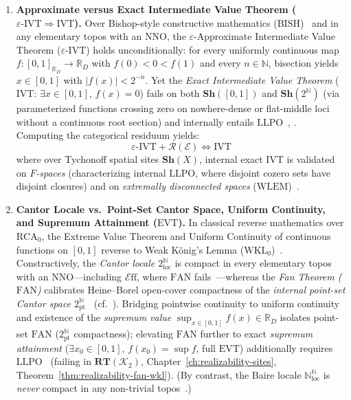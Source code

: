 \documentclass[10pt,twoside,openright]{book}
\theoremstyle{crmplain}
\theoremstyle{crmdef}
\theoremstyle{crmremark}
\newcommand{\Eff}{\mathcal{E}\mathrm{ff}}
\begin{document}
\begin{enumerate}[label=\textbf{\arabic*.},leftmargin=1.8em]
  \item \textbf{Approximate versus Exact Intermediate Value Theorem ($\varepsilon\text{-}\mathrm{IVT} \Rightarrow \mathrm{IVT}$).} Over Bishop-style constructive mathematics ($\mathrm{BISH}$)~\cite{Bishop67,Ishihara06} and in any elementary topos with an $\mathrm{NNO}$, the $\varepsilon$-Approximate Intermediate Value Theorem ($\varepsilon\text{-}\mathrm{IVT}$) holds unconditionally: for every uniformly continuous map $f: [0,1]_{\mathbb{R}_D} \to \mathbb{R}_D$ with $f(0) < 0 < f(1)$ and every $n \in \mathbb{N}$, bisection yields $x \in [0,1]$ with $|f(x)| < 2^{-n}$. Yet the \emph{Exact Intermediate Value Theorem} ($\mathrm{IVT}$: $\exists x \in [0,1],\, f(x) = 0$) fails on both $\mathbf{Sh}([0, 1])$ and $\mathbf{Sh}(2^{\mathbb{N}})$ (via parameterized functions crossing zero on nowhere-dense or flat-middle loci without a continuous root section) and internally entails $\mathrm{LLPO}$~\cite[Ch.~3]{BridgesRichman87}, \cite[\S D4.7]{Johnstone02}. Computing the categorical residuum yields:
\[
  \varepsilon\text{-}\mathrm{IVT} + \mathcal{R}(\mathcal{E}) \iff \mathrm{IVT}
\]
where over Tychonoff spatial sites $\mathbf{Sh}(X)$, internal exact $\mathrm{IVT}$ is validated on \emph{$F$-spaces} (characterizing internal $\mathrm{LLPO}$, where disjoint cozero sets have disjoint closures) and on \emph{extremally disconnected spaces} ($\mathrm{WLEM}$)~\cite[\S D4.7]{Johnstone02}.

  \item \textbf{Cantor Locale vs.\ Point-Set Cantor Space, Uniform Continuity, and Supremum Attainment ($\mathrm{EVT}$).} In classical reverse mathematics over $\mathrm{RCA}_0$, the Extreme Value Theorem and Uniform Continuity of continuous functions on $[0,1]$ reverse to Weak K\"onig's Lemma ($\mathrm{WKL}_0$)~\cite[Ch.~IV]{Simpson09}. Constructively, the \emph{Cantor locale $2^{\mathbb{N}}_{\mathrm{loc}}$} is compact in every elementary topos with an $\mathrm{NNO}$---including $\Eff$, where $\mathrm{FAN}$ fails~\cite[\S C1.2, \S D4.7]{Johnstone02}---whereas the \emph{Fan Theorem ($\mathrm{FAN}$)} calibrates Heine--Borel open-cover compactness of the \emph{internal point-set Cantor space $2^{\mathbb{N}}_{\mathrm{pt}}$}~\cite[Chs.~III--IV]{Johnstone82} (cf.~\cite{Bishop67,Ishihara06}). Bridging pointwise continuity to uniform continuity and existence of the \emph{supremum value} $\sup_{x \in [0,1]} f(x) \in \mathbb{R}_D$ isolates point-set $\mathrm{FAN}$ ($2^{\mathbb{N}}_{\mathrm{pt}}$ compactness); elevating $\mathrm{FAN}$ further to exact \emph{supremum attainment} ($\exists x_0 \in [0,1],\, f(x_0) = \sup f$, full $\mathrm{EVT}$) additionally requires $\mathrm{LLPO}$~\cite[Ch.~2]{BridgesRichman87} (failing in $\mathbf{RT}(\mathcal{K}_2)$, Chapter~\ref{ch:realizability-sites}, Theorem~\ref{thm:realizability-fan-wkl}). (By contrast, the Baire locale $\mathbb{N}^{\mathbb{N}}_{\mathrm{loc}}$ is \emph{never} compact in any non-trivial topos~\cite[Chs.~III--IV]{Johnstone82}.)

\end{enumerate}
\end{document}
